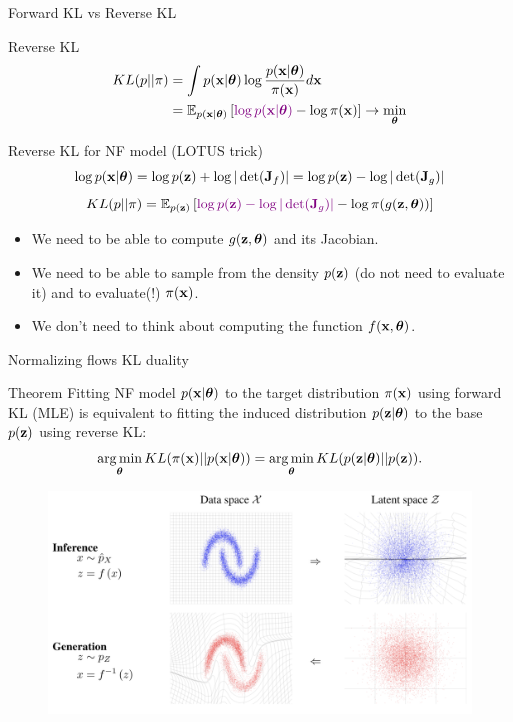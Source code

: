 \begin{frame}{Forward KL vs Reverse KL}
	\begin{block}{Reverse KL}
	  	\vspace{-0.5cm}
			\begin{align*}
				KL(p || \pi) &= \int p(\mathbf{x} | \boldsymbol{\theta}) \log \frac{p(\mathbf{x} | \boldsymbol{\theta})}{\pi(\mathbf{x})} d \mathbf{x} \\
				&= \mathbb{E}_{p(\mathbf{x} | \boldsymbol{\theta})} \left[{\color{violet}\log p(\mathbf{x} | \boldsymbol{\theta})} - \log \pi(\mathbf{x})\right] \rightarrow \min_{\boldsymbol{\theta}}
			\end{align*}
		\vspace{-0.7cm}
	\end{block}
	\begin{block}{Reverse KL for NF model (LOTUS trick)}
  		\vspace{-0.3cm}
		\[
			 \log p(\mathbf{x} | \boldsymbol{\theta}) = \log p(\mathbf{z}) +  \log  |\det (\mathbf{J}_f)| = \log p(\mathbf{z}) - \log |\det (\mathbf{J}_g)| 
		\]
		\[
			KL(p || \pi)  = \mathbb{E}_{p(\mathbf{z})} \left[ {\color{violet} \log p(\mathbf{z}) -  \log |\det (\mathbf{J}_g)| } - \log \pi(g(\mathbf{z}, \boldsymbol{\theta})) \right]
		\]
		\vspace{-0.3cm}
		\begin{itemize}
		\item We need to be able to compute $g(\mathbf{z}, \boldsymbol{\theta})$ and its Jacobian.
		\item We need to be able to sample from the density $p(\mathbf{z})$ (do not need to evaluate it) and to evaluate(!) $\pi(\mathbf{x})$.
		\item We don’t need to think about computing the function $f(\mathbf{x}, \boldsymbol{\theta})$.
		\end{itemize}
	\end{block}
\end{frame}
\begin{frame}{Normalizing flows KL duality}
	\begin{block}{Theorem}
		Fitting NF model $p(\mathbf{x}| \boldsymbol{\theta})$ to the target distribution $\pi(\mathbf{x})$ using forward KL (MLE) is equivalent to fitting the induced distribution $p(\mathbf{z}| \boldsymbol{\theta})$ to the base $p(\mathbf{z})$ using reverse KL:
		\vspace{-0.2cm}
		\[
			\operatorname*{arg\,min}_{\boldsymbol{\theta}} KL(\pi(\mathbf{x}) || p(\mathbf{x} | \boldsymbol{\theta})) = \operatorname*{arg\,min}_{\boldsymbol{\theta}} KL(p(\mathbf{z} | \boldsymbol{\theta}) || p(\mathbf{z})).
		\]
		\vspace{-0.7cm}
	\end{block}
	\begin{figure}
		\includegraphics[width=0.85\linewidth]{figs/flows_how2}
	\end{figure}
\end{frame}
